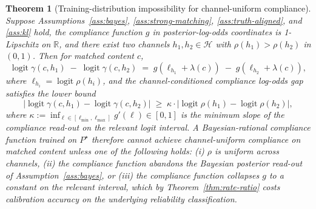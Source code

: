 \documentclass[11pt]{article}
\newtheorem{theorem}{Theorem}
\theoremstyle{definition}
\theoremstyle{remark}
\begin{document}
\begin{theorem}[Training-distribution impossibility for channel-uniform compliance]
\label{thm:impossibility}
Suppose Assumptions~\ref{ass:bayes}, \ref{ass:strong-matching},
\ref{ass:truth-aligned}, and \ref{ass:kl} hold, the compliance function $g$
in posterior-log-odds coordinates is 1-Lipschitz on $\mathbb{R}$, and there exist
two channels $h_1, h_2 \in \mathcal{H}$ with $\rho(h_1) > \rho(h_2)$ in $(0,1)$.
Then for matched content $c$,
\begin{equation}
\label{eq:impossibility}
\operatorname{logit} \gamma(c, h_1) \;-\; \operatorname{logit} \gamma(c, h_2)
\;=\; g(\ell_{h_1} + \lambda(c)) \;-\; g(\ell_{h_2} + \lambda(c)),
\end{equation}
where $\ell_{h_i} = \operatorname{logit} \rho(h_i)$, and the channel-conditioned
compliance log-odds gap satisfies the lower bound
\begin{equation}
\label{eq:nofreelunch}
\bigl| \operatorname{logit} \gamma(c, h_1) - \operatorname{logit} \gamma(c, h_2) \bigr|
\;\ge\; \kappa \cdot \bigl| \operatorname{logit} \rho(h_1) - \operatorname{logit} \rho(h_2) \bigr|,
\end{equation}
where $\kappa := \inf_{\ell \in [\ell_{\min}, \ell_{\max}]} g'(\ell) \in [0, 1]$ is
the minimum slope of the compliance read-out on the relevant logit interval. A
Bayesian-rational compliance function trained on $P^\star$ therefore cannot achieve
channel-uniform compliance on matched content unless one of the following holds:
(i) $\rho$ is uniform across channels, (ii) the compliance function abandons the
Bayesian posterior read-out of Assumption~\ref{ass:bayes}, or (iii) the compliance
function collapses $g$ to a constant on the relevant interval, which by
Theorem~\ref{thm:rate-ratio} costs calibration accuracy on the underlying reliability
classification.
\end{theorem}
\end{document}

